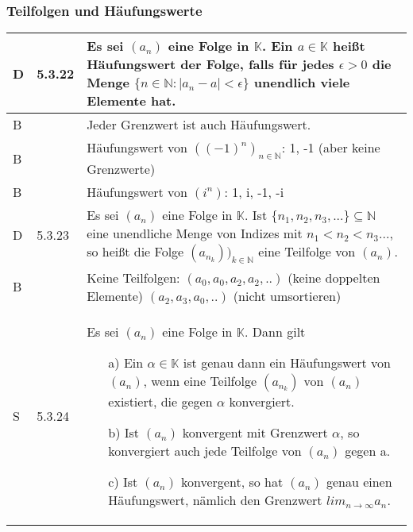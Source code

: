 \subsubsection{Teilfolgen und Häufungswerte}
      
    \begin{longtable}{p{0.75cm} p{1cm} p{16cm}}
        \toprule
        
        D   & 5.3.22&   Es sei $(a_n)$ eine Folge in $\mathbb{K}$. Ein $a \in \mathbb{K}$ heißt Häufungswert der Folge, falls für jedes
                        $\epsilon > 0$ die Menge $\{n \in \mathbb{N}: |a_n -a| < \epsilon\}$ unendlich viele Elemente hat. \\
        \midrule
        B   &       &   Jeder Grenzwert ist auch Häufungswert. \\
        \midrule
        B   &       &   Häufungswert von $((-1)^n)_{n \in \mathbb{N}}$: 1, -1 (aber keine Grenzwerte) \\
        \midrule
        B   &       &   Häufungswert von $(i^n)$: 1, i, -1, -i \\
        \midrule
        D   & 5.3.23&   Es sei $(a_n)$ eine Folge in $\mathbb{K}$. Ist $\{n_1,n_2,n_3,...\} \subseteq \mathbb{N}$ eine unendliche Menge 
                        von Indizes mit $n_1 < n_2 < n_3 ...$, so heißt die Folge $(a_{n_k}))_{k \in \mathbb{N}}$ eine Teilfolge von $(a_n)$. \\
        \midrule
        B   &       &   Keine Teilfolgen: \hfill \break
                        $(a_0, a_0, a_2, a_2,..)$ (keine doppelten Elemente) \hfill \break
                        $(a_2, a_3, a_0,..)$ (nicht umsortieren) \\
        \midrule
        S   & 5.3.24&   Es sei $(a_n)$ eine Folge in $\mathbb{K}$. Dann gilt
                            \begin{itemize}[topsep=-0.5cm]
                                \item[a)] Ein $\alpha \in \mathbb{K}$ ist genau dann ein Häufungswert von $(a_n)$, wenn eine Teilfolge $(a_{n_k})$ von
                                            $(a_n)$ existiert, die gegen $\alpha$ konvergiert.
                                \item[b)] Ist $(a_n)$ konvergent mit Grenzwert $\alpha$, so konvergiert auch jede Teilfolge von $(a_n)$ gegen a.
                                \item[c)] Ist $(a_n)$ konvergent, so hat $(a_n)$ genau einen Häufungswert, nämlich den Grenzwert 
                                            $lim_{n \rightarrow \infty} a_n$.
                            \end{itemize} \vspace{-0cm} \\
        \bottomrule
        
    \end{longtable}    

